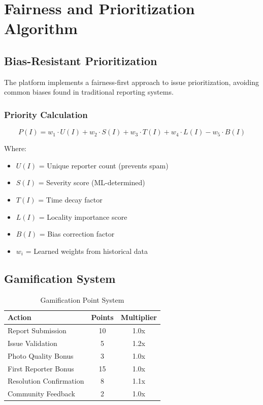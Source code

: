 \documentclass[12pt,a4paper]{article}
\begin{document}
\section{Fairness and Prioritization Algorithm}

\subsection{Bias-Resistant Prioritization}

The platform implements a fairness-first approach to issue prioritization, avoiding common biases found in traditional reporting systems.

\subsubsection{Priority Calculation}

\begin{equation}
P(I) = w_1 \cdot U(I) + w_2 \cdot S(I) + w_3 \cdot T(I) + w_4 \cdot L(I) - w_5 \cdot B(I)
\end{equation}

Where:
\begin{itemize}
    \item $U(I)$ = Unique reporter count (prevents spam)
    \item $S(I)$ = Severity score (ML-determined)
    \item $T(I)$ = Time decay factor
    \item $L(I)$ = Locality importance score
    \item $B(I)$ = Bias correction factor
    \item $w_i$ = Learned weights from historical data
\end{itemize}

\subsection{Gamification System}

\begin{table}[h]
\centering
\begin{tabular}{@{}lcc@{}}
\toprule
\textbf{Action} & \textbf{Points} & \textbf{Multiplier} \\
\midrule
Report Submission & 10 & 1.0x \\
Issue Validation & 5 & 1.2x \\
Photo Quality Bonus & 3 & 1.0x \\
First Reporter Bonus & 15 & 1.0x \\
Resolution Confirmation & 8 & 1.1x \\
Community Feedback & 2 & 1.0x \\
\bottomrule
\end{tabular}
\caption{Gamification Point System}
\end{table}
\end{document}
